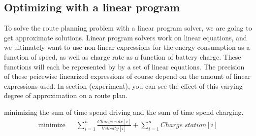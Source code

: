 \subsection{Optimizing with a linear program}
To solve the route planning problem with a linear program solver, we are going to get approximate solutions. Linear program solvers work on linear equations, and we ultimately want to use non-linear expressions for the energy consumption as a function of speed, as well as charge rate as a function of battery charge. These functions will each be represented by by a set of linear equations. The precision of these peicewise linearized expressions of course depend on the amount of linear expressions used. In section (experiment), you can see the effect of this varying degree of approximation on a route plan.
 
minimizing the sum of time spend driving and the sum of time spend charging. 
\begin{equation}
\begin{aligned}
{\text{minimize}}
& & \sum_{i=1}^{n} \frac{Charge\;rate[i]}{Velocity[i]} + \sum_{i=1}^{n} Charge\;station[i] \\
\end{aligned}
\end{equation}\label{eq:objfunction}

